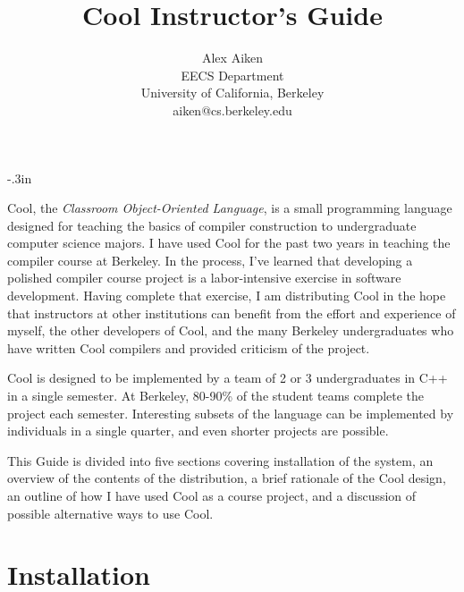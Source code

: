 
\oddsidemargin -0.25in
\evensidemargin -0.25in

\textwidth 6.9in

\topmargin -.3in

\textheight 8.7in



\title{Cool Instructor's Guide}
\author{Alex Aiken \\ EECS Department \\ University of California, Berkeley \\
aiken@cs.berkeley.edu}
\date{ }
\maketitle

Cool, the {\em Classroom Object-Oriented Language}, is a small
programming language designed for teaching the basics of
compiler construction to undergraduate computer science majors.  I
have used Cool for the past two years in teaching the compiler course
at Berkeley.  In the process, I've learned that developing a polished
compiler course project is a labor-intensive exercise in software
development.  Having complete that exercise, I am distributing Cool in
the hope that instructors at other institutions can benefit from the
effort and experience of myself, the other developers of Cool, and the
many Berkeley undergraduates who have written Cool compilers
and provided criticism of the project.

Cool is designed to be implemented by a team of 2 or 3 undergraduates
in C++ in a single semester.  At Berkeley, 80-90\% of the student
teams complete the project each semester.  Interesting subsets of the
language can be implemented by individuals in a single quarter, and
even shorter projects are possible.

This Guide is divided into five sections covering installation of the
system, an overview of the contents of the distribution, a brief rationale
of the Cool design, an outline of how I have used Cool as a course project,
and a discussion of possible alternative ways to use Cool.  

\section{Installation}

